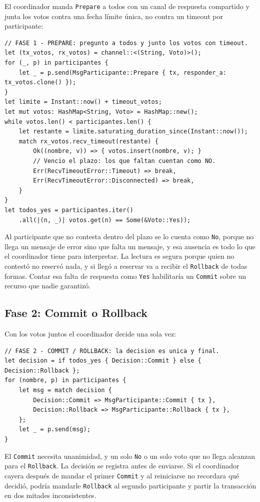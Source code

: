 El coordinador manda \texttt{Prepare} a todos con un canal de respuesta
compartido y junta los votos contra una fecha límite única, no contra un
timeout por participante:

\begin{lstlisting}
// FASE 1 - PREPARE: pregunto a todos y junto los votos con timeout.
let (tx_votos, rx_votos) = channel::<(String, Voto)>();
for (_, p) in participantes {
    let _ = p.send(MsgParticipante::Prepare { tx, responder_a: tx_votos.clone() });
}
let limite = Instant::now() + timeout_votos;
let mut votos: HashMap<String, Voto> = HashMap::new();
while votos.len() < participantes.len() {
    let restante = limite.saturating_duration_since(Instant::now());
    match rx_votos.recv_timeout(restante) {
        Ok((nombre, v)) => { votos.insert(nombre, v); }
        // Vencio el plazo: los que faltan cuentan como NO.
        Err(RecvTimeoutError::Timeout) => break,
        Err(RecvTimeoutError::Disconnected) => break,
    }
}
let todos_yes = participantes.iter()
    .all(|(n, _)| votos.get(n) == Some(&Voto::Yes));
\end{lstlisting}

Al participante que no contesta dentro del plazo se lo cuenta como
\texttt{No}, porque no llega un mensaje de error sino que falta un mensaje,
y esa ausencia es todo lo que el coordinador tiene para interpretar. La
lectura es segura porque quien no contestó no reservó nada, y si llegó a
reservar va a recibir el \texttt{Rollback} de todas formas. Contar esa falta
de respuesta como \texttt{Yes} habilitaría un \texttt{Commit} sobre un
recurso que nadie garantizó.

\subsection{Fase 2: Commit o Rollback}

Con los votos juntos el coordinador decide una sola vez:

\begin{lstlisting}
// FASE 2 - COMMIT / ROLLBACK: la decision es unica y final.
let decision = if todos_yes { Decision::Commit } else { Decision::Rollback };
for (nombre, p) in participantes {
    let msg = match decision {
        Decision::Commit => MsgParticipante::Commit { tx },
        Decision::Rollback => MsgParticipante::Rollback { tx },
    };
    let _ = p.send(msg);
}
\end{lstlisting}

El \texttt{Commit} necesita unanimidad, y un solo \texttt{No} o un solo voto
que no llega alcanzan para el \texttt{Rollback}. La decisión se registra
antes de enviarse. Si el coordinador cayera después de mandar el primer
\texttt{Commit} y al reiniciarse no recordara qué decidió, podría mandarle
\texttt{Rollback} al segundo participante y partir la transacción en dos
mitades inconsistentes.

